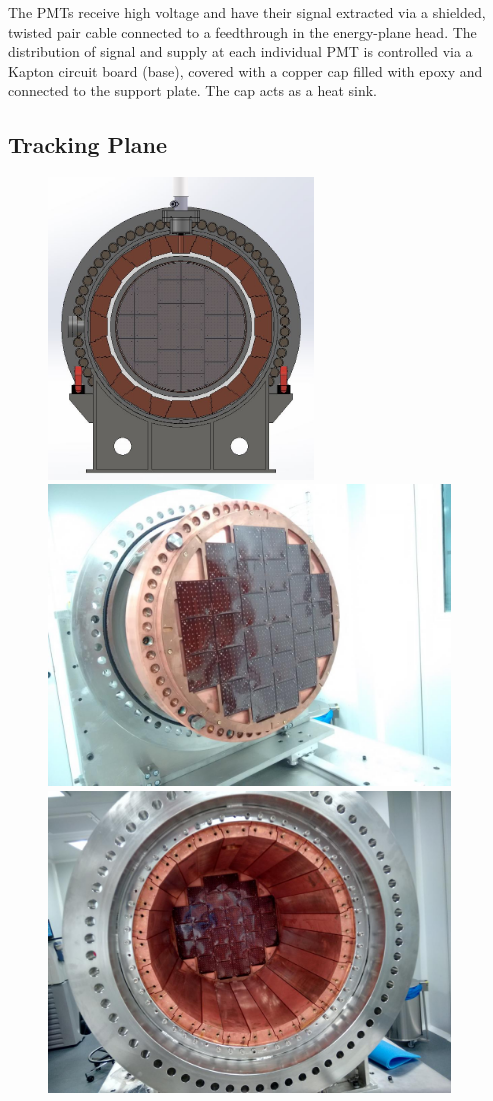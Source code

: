 The PMTs receive high voltage and have their signal extracted via a
shielded, twisted pair cable connected to a feedthrough in the energy-plane head. The distribution of
signal and supply at each individual PMT is controlled via a
Kapton circuit board (base), covered with a
copper cap filled with epoxy and connected to the support plate. The cap acts as a heat sink.


\subsection{Tracking Plane}

\begin{figure}[hpt!]
\centering
\includegraphics[height=8cm]{img2/TrackingPlane.png}
\includegraphics[height=8cm]{img2/TPI1.png}
\includegraphics[height=8cm]{img2/TrackingPlaneFromEP.png}


\end{figure}
